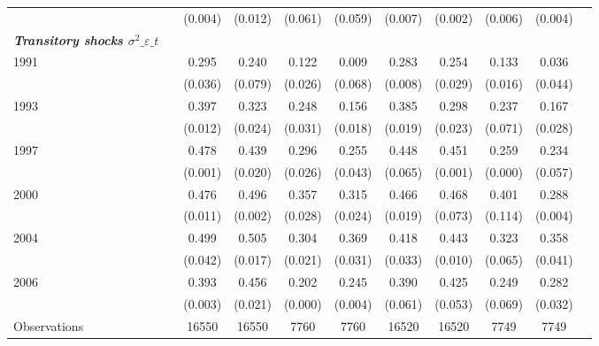 \begin{tabular}{l*{10}{c}}
                    &            &     (0.004)&     (0.012)&     (0.061)&     (0.059)&     (0.007)&     (0.002)&     (0.006)&     (0.004)\\
\textbf{\emph{Transitory shocks $\sigma^2\_{\varepsilon\_t}$}}&            &            &            &            &            &            &            &            &            \\
\hspace{.3cm} 1991  &            &       0.295&       0.240&       0.122&       0.009&       0.283&       0.254&       0.133&       0.036\\
                    &            &     (0.036)&     (0.079)&     (0.026)&     (0.068)&     (0.008)&     (0.029)&     (0.016)&     (0.044)\\
\hspace{.3cm} 1993  &            &       0.397&       0.323&       0.248&       0.156&       0.385&       0.298&       0.237&       0.167\\
                    &            &     (0.012)&     (0.024)&     (0.031)&     (0.018)&     (0.019)&     (0.023)&     (0.071)&     (0.028)\\
\hspace{.3cm} 1997  &            &       0.478&       0.439&       0.296&       0.255&       0.448&       0.451&       0.259&       0.234\\
                    &            &     (0.001)&     (0.020)&     (0.026)&     (0.043)&     (0.065)&     (0.001)&     (0.000)&     (0.057)\\
\hspace{.3cm} 2000  &            &       0.476&       0.496&       0.357&       0.315&       0.466&       0.468&       0.401&       0.288\\
                    &            &     (0.011)&     (0.002)&     (0.028)&     (0.024)&     (0.019)&     (0.073)&     (0.114)&     (0.004)\\
\hspace{.3cm} 2004  &            &       0.499&       0.505&       0.304&       0.369&       0.418&       0.443&       0.323&       0.358\\
                    &            &     (0.042)&     (0.017)&     (0.021)&     (0.031)&     (0.033)&     (0.010)&     (0.065)&     (0.041)\\
\hspace{.3cm} 2006  &            &       0.393&       0.456&       0.202&       0.245&       0.390&       0.425&       0.249&       0.282\\
                    &            &     (0.003)&     (0.021)&     (0.000)&     (0.004)&     (0.061)&     (0.053)&     (0.069)&     (0.032)\\
\midrule
Observations        &            &       16550&       16550&        7760&        7760&       16520&       16520&        7749&        7749\\
\bottomrule
\end{tabular}

